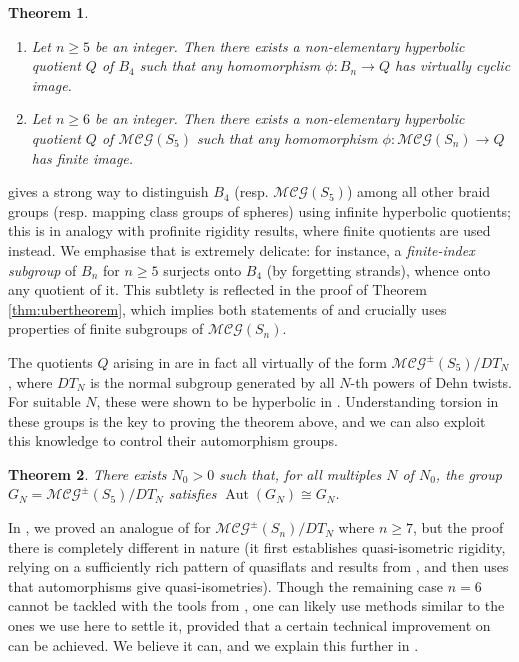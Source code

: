 \documentclass[svgnames]{amsart}
\theoremstyle{plain}
\newtheorem{thmintro}{Theorem}
\theoremstyle{definition}
\newcommand{\MCG}{\mathcal{MCG}}
\newcommand{\Aut}[1]{\operatorname{Aut}\left(#1\right)}
\begin{document}
\begin{thmintro}\label{thmintro:distinguish}
    \begin{enumerate}
    \item Let $n\geq 5$ be an integer. Then there exists a non-elementary hyperbolic quotient $Q$ of $B_4$ such that any homomorphism $\phi\colon B_n\to Q$ has virtually cyclic image.
    \item Let $n\geq 6$ be an integer. Then there exists a non-elementary hyperbolic quotient $Q$ of $\MCG(S_5)$ such that any homomorphism $\phi\colon\MCG(S_n)\to Q$ has finite image.
    \end{enumerate}
\end{thmintro}

\noindent {} gives a strong way to distinguish $B_4$ (resp. $\MCG(S_5)$) among all other braid groups (resp. mapping class groups of spheres) using infinite hyperbolic quotients; this is in analogy with profinite rigidity results, where finite quotients are used instead. We emphasise that  is extremely delicate: for instance, a \emph{finite-index subgroup} of $B_n$ for $n\geq 5$ surjects onto $B_4$ (by forgetting strands), whence onto any quotient of it. This subtlety is reflected in the proof of Theorem \ref{thm:ubertheorem}, which implies both statements of  and crucially uses properties of finite subgroups of $\MCG(S_n)$. 


The quotients $Q$ arising in  are in fact all virtually of the form $\MCG^\pm(S_5)/DT_N$, where $DT_N$ is the normal subgroup generated by all $N$-th powers of Dehn twists. For suitable $N$, these were shown to be hyperbolic in \cite{dfdt}. Understanding torsion in these groups is the key to proving the theorem above, and we can also exploit this knowledge to control their automorphism groups.

\begin{thmintro}\label{thmintro:automorphisms}
    There exists $N_0>0$ such that, for all multiples $N$ of $N_0$, the group $G_N=\MCG^\pm(S_5)/DT_N$ satisfies $\Aut{G_N}\cong G_N$.
\end{thmintro}

In \cite{rigidity_mcg_mod_dt}, we proved an analogue of  for $\MCG^\pm(S_n)/DT_N$ where $n\ge 7$, but the proof there is completely different in nature (it first establishes quasi-isometric rigidity, relying on a sufficiently rich pattern of quasiflats and results from \cite{quasiflats}, and then uses that automorphisms give quasi-isometries). Though the remaining case $n=6$ cannot be tackled with the tools from \cite{rigidity_mcg_mod_dt}, one can likely use methods similar to the ones we use here to settle it, provided that a certain technical improvement on \cite{BHMS} can be achieved. We believe it can, and we explain this further in .
\end{document}
